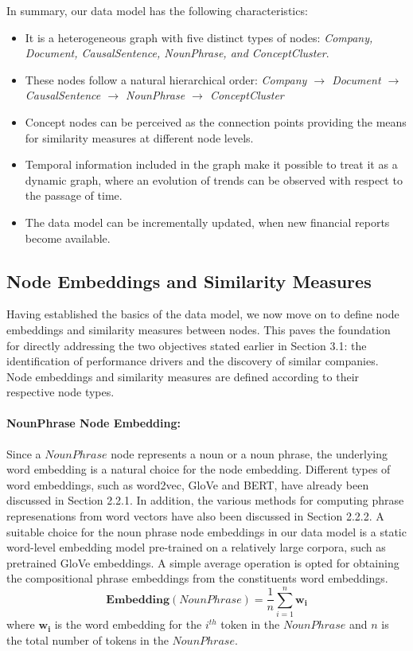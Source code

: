 In summary, our data model has the following characteristics: 

\begin{itemize}
	\item	 It is a heterogeneous graph with five distinct types of nodes: \emph{Company, Document, CausalSentence, NounPhrase, and ConceptCluster}.
	\item	 These nodes follow a natural hierarchical order: \emph{Company $\rightarrow$ Document $\rightarrow$  CausalSentence $\rightarrow$ NounPhrase $\rightarrow$ ConceptCluster} 
	\item 	Concept nodes can be perceived as the connection points providing the means for similarity measures at different node levels. 
	\item 	Temporal information included in the graph make it possible to treat it as a dynamic graph, where an evolution of trends can be observed with respect to the passage of time. 
	\item 	The data model can be incrementally updated, when new financial reports become available.
\end{itemize}





\subsection{Node Embeddings and Similarity Measures} \label{sec:similarity}

Having established the basics of the data model, we now move on to define node embeddings and similarity measures between nodes. This paves the foundation for directly addressing the two objectives stated earlier in Section 3.1: the identification of performance drivers and the discovery of similar companies. Node embeddings and similarity measures are defined according to their respective node types.


\paragraph{NounPhrase Node Embedding:} Since a $NounPhrase$ node represents a noun or a noun phrase, the underlying word embedding is a natural choice for the node embedding. Different types of word embeddings, such as word2vec, GloVe and BERT, have already been discussed in Section 2.2.1. In addition, the various methods for computing phrase represenations from word vectors have also been discussed in Section 2.2.2. A suitable choice for the noun phrase node embeddings in our data model is a static word-level embedding model pre-trained on a relatively large corpora, such as pretrained GloVe embeddings. A simple average operation is opted for obtaining the compositional phrase embeddings from the constituents word embeddings. 
\[ \mathbf{Embedding}(NounPhrase) = \frac{1}{n} \sum_{i=1} ^n {\mathbf{w_i}}\]  
where $\mathbf{w_i}$ is the word embedding for the $i^{th}$ token in the $NounPhrase$ and $n$ is the total number of tokens in the $NounPhrase$. 

